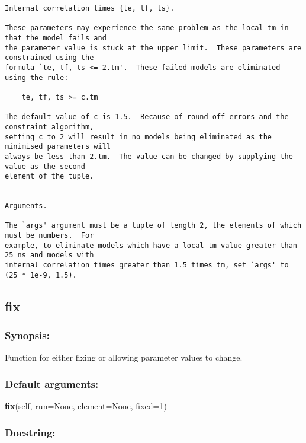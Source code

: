{\begin{verbatim}
Internal correlation times {te, tf, ts}.

These parameters may experience the same problem as the local tm in that the model fails and
the parameter value is stuck at the upper limit.  These parameters are constrained using the
formula `te, tf, ts <= 2.tm'.  These failed models are eliminated using the rule:

    te, tf, ts >= c.tm

The default value of c is 1.5.  Because of round-off errors and the constraint algorithm,
setting c to 2 will result in no models being eliminated as the minimised parameters will
always be less than 2.tm.  The value can be changed by supplying the value as the second
element of the tuple.


Arguments.

The `args' argument must be a tuple of length 2, the elements of which must be numbers.  For
example, to eliminate models which have a local tm value greater than 25 ns and models with
internal correlation times greater than 1.5 times tm, set `args' to (25 * 1e-9, 1.5).
\end{verbatim}
}



\newpage

\subsection{fix}


\subsubsection{Synopsis:}

Function for either fixing or allowing parameter values to change.

\subsubsection{Default arguments:}

\textsf{\textbf{fix}(self, run=None, element=None, fixed=1)
}


\subsubsection{Docstring:}

